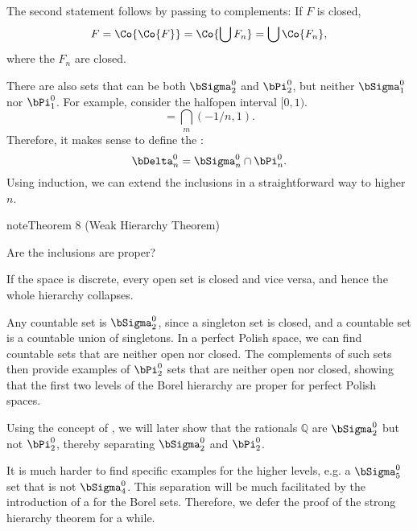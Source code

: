 \documentclass[letterpaper,10pt,english]{jupyterBook}
\begin{document}
\sphinxAtStartPar
The second statement follows by passing to complements: If \(F\) is closed,
\begin{equation*}
	F = \Co{\Co{F}} = \Co{\bigcup F_n} = \bigcup \Co{F_n},
\end{equation*}
\sphinxAtStartPar
where the \(F_n\) are closed.

\sphinxAtStartPar
There are also sets that can be both \(\bSigma^0_2\) and \(\bPi^0_2\), but neither \(\bSigma^0_1\) nor \(\bPi^0_1\). For example, consider the half\sphinxhyphen{}open interval \([0,1)\).
\begin{equation*}
	[0,1) = \bigcup_n [0,1-1/n] = \bigcap_m (-1/n,1).
\end{equation*}
\sphinxAtStartPar
Therefore, it makes sense to define the :
\begin{equation*}
	\bDelta^0_n = \bSigma^0_n \cap \bPi^0_n.
\end{equation*}
\sphinxAtStartPar
Using induction, we can extend the inclusions in a straightforward way to higher \(n\).
\label{Borel:thm-weak-Borel-hierarchy}
\begin{sphinxadmonition}{note}{Theorem 8 (Weak Hierarchy Theorem)}



\sphinxAtStartPar
{}
\end{sphinxadmonition}

\sphinxAtStartPar
Are the inclusions are proper?

\sphinxAtStartPar
If the space is discrete, every open set is closed and vice versa, and hence the whole hierarchy collapses.

\sphinxAtStartPar
Any countable set is \(\bSigma^0_2\), since a singleton set is closed, and a countable set is a countable union of singletons.
In a perfect Polish space, we can find countable sets that are neither open nor closed. The complements of such sets then provide examples of \(\bPi^0_2\) sets that are neither open nor closed, showing that the first two levels of the Borel hierarchy are proper for perfect Polish spaces.

\sphinxAtStartPar
Using the concept of , we will later show that the rationals \(\mathbb{Q}\) are \(\bSigma^0_2\) but not \(\bPi^0_2\), thereby separating \(\bSigma^0_2\) and \(\bPi^0_2\).

\sphinxAtStartPar
It is much harder to find specific examples for the higher levels, e.g. a \(\bSigma^0_5\) set that is not \(\bSigma^0_4\). This separation will be much facilitated by the introduction of a  for the Borel sets. Therefore, we defer the proof of the strong hierarchy theorem for a while.
\end{document}
